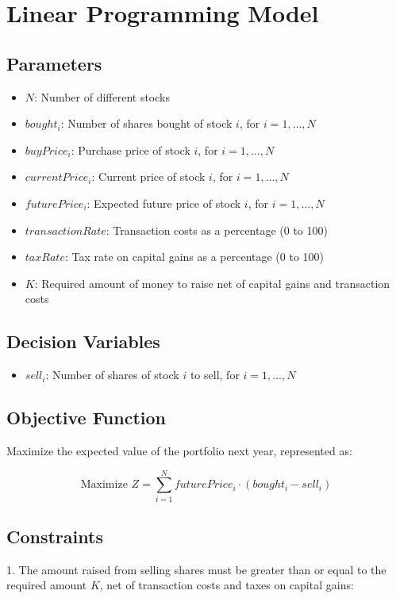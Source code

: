 \documentclass{article}
\begin{document}
\section*{Linear Programming Model}

\subsection*{Parameters}
\begin{itemize}
    \item $N$: Number of different stocks
    \item $bought_i$: Number of shares bought of stock $i$, for $i = 1, \ldots, N$
    \item $buyPrice_i$: Purchase price of stock $i$, for $i = 1, \ldots, N$
    \item $currentPrice_i$: Current price of stock $i$, for $i = 1, \ldots, N$
    \item $futurePrice_i$: Expected future price of stock $i$, for $i = 1, \ldots, N$
    \item $transactionRate$: Transaction costs as a percentage (0 to 100)
    \item $taxRate$: Tax rate on capital gains as a percentage (0 to 100)
    \item $K$: Required amount of money to raise net of capital gains and transaction costs
\end{itemize}

\subsection*{Decision Variables}
\begin{itemize}
    \item $sell_i$: Number of shares of stock $i$ to sell, for $i = 1, \ldots, N$
\end{itemize}

\subsection*{Objective Function}
Maximize the expected value of the portfolio next year, represented as:

\[
\text{Maximize } Z = \sum_{i=1}^{N} futurePrice_i \cdot (bought_i - sell_i)
\]

\subsection*{Constraints}
1. The amount raised from selling shares must be greater than or equal to the required amount $K$, net of transaction costs and taxes on capital gains:
\end{document}
